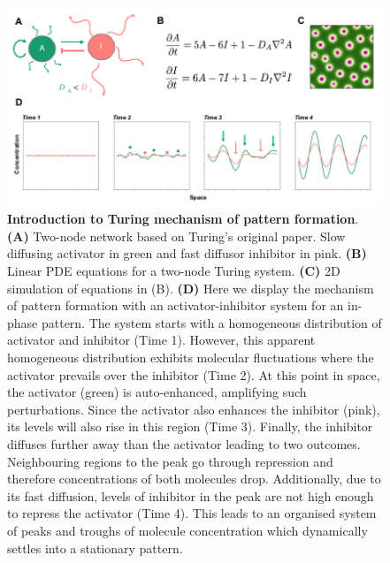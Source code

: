 \begin{figure}[h!]
    \centering
    \includegraphics[width=1\textwidth]{chapters/Introduction/intro_to_Turing_patterns}
    \caption{\textbf{Introduction to Turing mechanism of pattern formation}. \textbf{(A)} Two-node network based on Turing's original paper. Slow diffusing activator in green and fast diffusor inhibitor in pink. \textbf{(B)} Linear PDE equations for a two-node Turing system. \textbf{(C)} 2D simulation of equations in (B). \textbf{(D)} Here we display the mechanism of pattern formation with an activator-inhibitor system for an in-phase pattern. The system starts with a homogeneous distribution of activator and inhibitor (Time 1). However, this apparent homogeneous distribution exhibits molecular fluctuations where the activator prevails over the inhibitor (Time 2). At this point in space, the activator (green) is auto-enhanced, amplifying such perturbations. Since the activator also enhances the inhibitor (pink), its levels will also rise in this region (Time 3). Finally, the inhibitor diffuses further away than the activator leading to two outcomes. Neighbouring regions to the peak go through repression and therefore concentrations of both molecules drop. Additionally, due to its fast diffusion, levels of inhibitor in the peak are not high enough to repress the activator  (Time 4). This leads to an organised system of peaks and troughs of molecule concentration which dynamically settles into a stationary pattern.}
    \label{fig:intro_to_Turing_patterns}
\end{figure}


